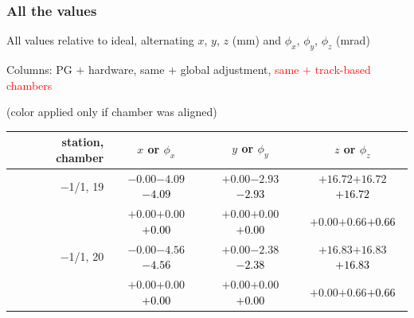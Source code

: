 \documentclass[compress]{beamer}
\begin{document}
\begin{frame}
\frametitle{All the values}
\tiny

All values relative to ideal, alternating $x$, $y$, $z$ (mm) and $\phi_x$, $\phi_y$, $\phi_z$ (mrad)

Columns: PG $+$ hardware, same $+$ global adjustment, \textcolor{red}{same $+$ track-based chambers}

\hfill (color applied only if chamber was aligned)

\vfill
\renewcommand{\arraystretch}{1.1}
\begin{tabular}{r | c | c | c}
station, chamber & $x$ or $\phi_x$ & $y$ or $\phi_y$ & $z$ or $\phi_z$ \\\hline
$-$1/1, 19 & $-0.00$\hspace{0.1 cm}$-4.09$\hspace{0.1 cm}\textcolor{black}{$-4.09$} & $+0.00$\hspace{0.1 cm}$-2.93$\hspace{0.1 cm}\textcolor{black}{$-2.93$} & $+16.72$\hspace{0.1 cm}$+16.72$\hspace{0.1 cm}\textcolor{black}{$+16.72$} \\
           & $+0.00$\hspace{0.1 cm}$+0.00$\hspace{0.1 cm}\textcolor{black}{$+0.00$} & $+0.00$\hspace{0.1 cm}$+0.00$\hspace{0.1 cm}\textcolor{black}{$+0.00$} & $+0.00$\hspace{0.1 cm}$+0.66$\hspace{0.1 cm}\textcolor{black}{$+0.66$} \\
$-$1/1, 20 & $-0.00$\hspace{0.1 cm}$-4.56$\hspace{0.1 cm}\textcolor{black}{$-4.56$} & $+0.00$\hspace{0.1 cm}$-2.38$\hspace{0.1 cm}\textcolor{black}{$-2.38$} & $+16.83$\hspace{0.1 cm}$+16.83$\hspace{0.1 cm}\textcolor{black}{$+16.83$} \\
           & $+0.00$\hspace{0.1 cm}$+0.00$\hspace{0.1 cm}\textcolor{black}{$+0.00$} & $+0.00$\hspace{0.1 cm}$+0.00$\hspace{0.1 cm}\textcolor{black}{$+0.00$} & $+0.00$\hspace{0.1 cm}$+0.66$\hspace{0.1 cm}\textcolor{black}{$+0.66$} \\

\end{tabular}
\end{frame}
\end{document}
